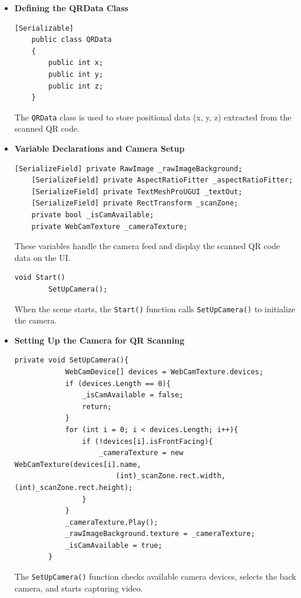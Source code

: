 \begin{itemize}
    \item \textbf{Defining the QRData Class}

    \begin{lstlisting}[style=cSharp]
    [Serializable]
    public class QRData
    {
        public int x;
        public int y;
        public int z;
    }
    \end{lstlisting}
    The \texttt{QRData} class is used to store positional data (x, y, z) extracted from the scanned QR code.

    \item \textbf{Variable Declarations and Camera Setup}
    \begin{lstlisting}[style=cSharp]
    [SerializeField] private RawImage _rawImageBackground;
    [SerializeField] private AspectRatioFitter _aspectRatioFitter;
    [SerializeField] private TextMeshProUGUI _textOut;
    [SerializeField] private RectTransform _scanZone;
    private bool _isCamAvailable;
    private WebCamTexture _cameraTexture;
    \end{lstlisting}
    These variables handle the camera feed and display the scanned QR code data on the UI.
    
    \begin{lstlisting}[style=cSharp]
    void Start()
        SetUpCamera();
    \end{lstlisting}
    When the scene starts, the \texttt{Start()} function calls \texttt{SetUpCamera()} to initialize the camera.

    \item \textbf{Setting Up the Camera for QR Scanning}
        \begin{lstlisting}[style=cSharp]
        private void SetUpCamera(){
            WebCamDevice[] devices = WebCamTexture.devices;
            if (devices.Length == 0){
                _isCamAvailable = false;
                return;
            }
            for (int i = 0; i < devices.Length; i++){
                if (!devices[i].isFrontFacing){
                    _cameraTexture = new WebCamTexture(devices[i].name, 
                        (int)_scanZone.rect.width, (int)_scanZone.rect.height);
                }
            }
            _cameraTexture.Play();
            _rawImageBackground.texture = _cameraTexture;
            _isCamAvailable = true;
        }
        \end{lstlisting}
        The \texttt{SetUpCamera()} function checks available camera devices, selects the back camera, and starts capturing video.


\end{itemize}

